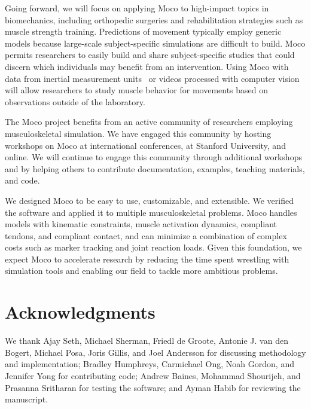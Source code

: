 \documentclass[10pt,letterpaper]{article}
\begin{document}
Going forward, we will focus on applying Moco to high-impact topics in biomechanics, including orthopedic surgeries and rehabilitation strategies such as muscle strength training. Predictions of movement typically employ generic models because large-scale subject-specific simulations are difficult to build. Moco permits researchers to easily build and share subject-specific studies that could discern which individuals may benefit from an intervention. Using Moco with data from inertial measurement units~\cite{Dorschky:2019} or videos processed with computer vision~\cite{OpenPose:2019} will allow researchers to study muscle behavior for movements based on observations outside of the laboratory.

The Moco project benefits from an active community of researchers employing musculoskeletal simulation. We have engaged this community by hosting workshops on Moco at international conferences, at Stanford University, and online. We will continue to engage this community through additional workshops and by helping others to contribute documentation, examples, teaching materials, and code.

We designed Moco to be easy to use, customizable, and extensible. We verified the software and applied it to multiple musculoskeletal problems. Moco handles models with kinematic constraints, muscle activation dynamics, compliant tendons, and compliant contact, and can minimize a combination of complex costs such as marker tracking and joint reaction loads. Given this foundation, we expect Moco to accelerate research by reducing the time spent wrestling with simulation tools and enabling our field to tackle more ambitious problems.

\section*{Acknowledgments}

We thank Ajay Seth, Michael Sherman, Friedl de Groote, Antonie J. van den Bogert, Michael Posa, Joris Gillis, and Joel Andersson for discussing methodology and implementation; Bradley Humphreys, Carmichael Ong, Noah Gordon, and Jennifer Yong for contributing code; Andrew Baines, Mohammad Shourijeh, and Prasanna Sritharan for testing the software; and Ayman Habib for reviewing the manuscript.

\nolinenumbers

%
%
%
\end{document}
